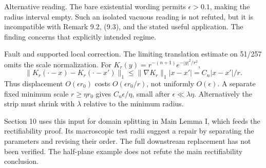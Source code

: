 \documentclass[10pt]{article}
\begin{document}
Alternative reading. The bare existential wording permits \(\epsilon>0.1\), making the radius interval empty. Such an isolated vacuous reading is not refuted, but it is incompatible with Remark 9.2, (9.3), and the stated useful application. The finding concerns that explicitly intended regime.\par
Fault and supported local correction. The limiting translation estimate on 51/257 omits the scale normalization. For \(K_r(y)=r^{-(n+1)}e^{-|y|^2/r^2}\), \[\|K_r(\cdot-x)-K_r(\cdot-x')\|_1
 \le\|\nabla K_r\|_1|x-x'|=C_n|x-x'|/r.\] Thus displacement \(O(\epsilon r_0)\) costs \(O(\epsilon r_0/r)\), not uniformly \(O(\epsilon)\). A separate fixed minimum scale \(r\ge\eta r_0\) gives \(C_n\epsilon/\eta\), small after \(\epsilon\ll\lambda\eta\). Alternatively the strip must shrink with \(\lambda\) relative to the minimum radius.\par
Section 10 uses this input for domain splitting in Main Lemma I, which feeds the rectifiability proof. Its macroscopic test radii suggest a repair by separating the parameters and revising their order. The full downstream replacement has not been verified. The half-plane example does not refute the main rectifiability conclusion.\par
\end{document}
